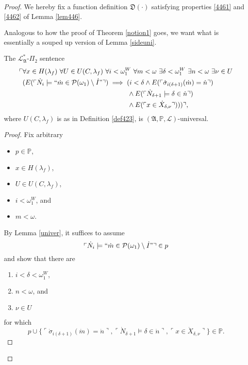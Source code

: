 \documentclass[12pt]{article}
\numberwithin{equation}{section}
\begin{document}
\begin{proof}
We hereby fix a function definition $\mathfrak{D}(\cdot)$ satisfying properties \ref{4461} and \ref{4462} of Lemma \ref{lem446}.

Analogous to how the proof of Theorem \ref{notion1} goes, we want what is essentially a souped up version of Lemma \ref{sideuni}.

\begin{lem}\label{lem452}
The $\mathcal{L}^*_{\mathfrak{A}}$-$\Pi_2$ sentence 
\begin{align}\label{eq4.4}
\begin{split}
    \ulcorner & \forall x \in H(\lambda_f) \ \forall U \in U(C, \lambda_f) \ \forall i < \omega_1^W \ \forall m < \omega \ \exists \delta < \omega_1^W \ \exists n < \omega \ \exists \nu \in U \\ 
    & (E(\ulcorner \dot{N}_i \models ``\dot{m} \in \mathcal{P}(\omega_1) \setminus \dot{I}" \urcorner) \implies (i < \delta \wedge E(\ulcorner \dot{\sigma}_{i(\delta + 1)}(\dot{m}) = \dot{n} \urcorner) \\
    & \mspace{279mu} \wedge E(\ulcorner \dot{N}_{\delta + 1} \models \delta \in \dot{n} \urcorner) \\
    & \mspace{279mu} \wedge E(\ulcorner x \in \dot{X}_{\delta, \nu} \urcorner))) \urcorner \text{,}
\end{split}
\end{align}
where $U(C, \lambda_f)$ is as in Definition \ref{def423}, is $(\mathfrak{A}, \mathbb{P}, \mathcal{L})$-universal.
\end{lem}

\begin{proof}
Fix arbitrary
\begin{itemize}
    \item $p \in \mathbb{P}$,
    \item $x \in H(\lambda_f)$,
    \item $U \in U(C, \lambda_f)$,
    \item $i < \omega_1^W$, and
    \item $m < \omega$.
\end{itemize}
By Lemma \ref{univer}, it suffices to assume 
\begin{equation}\label{eq4.5}
    \ulcorner \dot{N}_i \models ``\dot{m} \in \mathcal{P}(\omega_1) \setminus \dot{I}" \urcorner \in p
\end{equation}
and show that there are 
\begin{enumerate}[label=(\Alph*)]
    \item $i < \delta < \omega_1^W$,
    \item $n < \omega$, and
    \item $\nu \in U$
\end{enumerate} 
for which 
\begin{equation*}
    p \cup \{\ulcorner \dot{\sigma}_{i(\delta + 1)}(\dot{m}) = \dot{n} \urcorner, \ulcorner \dot{N}_{\delta + 1} \models \delta \in \dot{n} \urcorner, \ulcorner x \in \dot{X}_{\delta, \nu} \urcorner\} \in \mathbb{P} \text{.}
\end{equation*}


\end{proof}
\end{proof}
\end{document}
